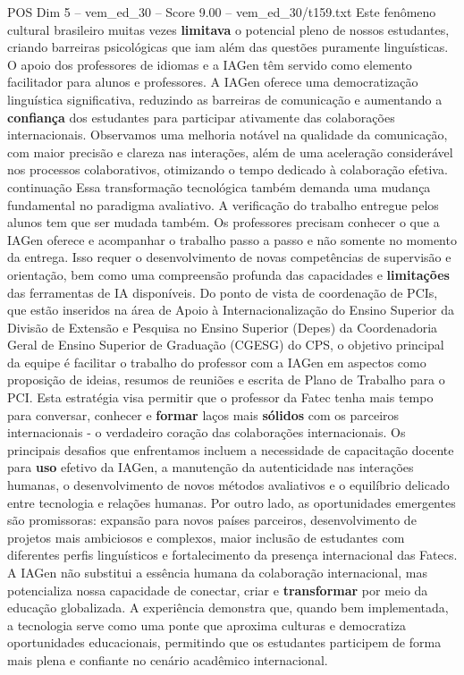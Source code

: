 \begin{textsample}{POS Dim 5 – vem\_ed\_30 – Score 9.00 – vem\_ed\_30/t159.txt}
Este fenômeno cultural brasileiro muitas vezes \textbf{limitava} o potencial pleno de nossos estudantes, criando barreiras psicológicas que iam além das questões puramente linguísticas.
O apoio dos professores de idiomas e a IAGen têm servido como elemento facilitador para alunos e professores.
A IAGen oferece uma democratização linguística significativa, reduzindo as barreiras de comunicação e aumentando a \textbf{confiança} dos estudantes para participar ativamente das colaborações internacionais.
Observamos uma melhoria notável na qualidade da comunicação, com maior precisão e clareza nas interações, além de uma aceleração considerável nos processos colaborativos, otimizando o tempo dedicado à colaboração efetiva. continuação Essa transformação tecnológica também demanda uma mudança fundamental no paradigma avaliativo.
A verificação do trabalho entregue pelos alunos tem que ser mudada também.
Os professores precisam conhecer o que a IAGen oferece e acompanhar o trabalho passo a passo e não somente no momento da entrega.
Isso requer o desenvolvimento de novas competências de supervisão e orientação, bem como uma compreensão profunda das capacidades e \textbf{limitações} das ferramentas de IA disponíveis.
Do ponto de vista de coordenação de PCIs, que estão inseridos na área de Apoio à Internacionalização do Ensino Superior da Divisão de Extensão e Pesquisa no Ensino Superior (Depes) da Coordenadoria Geral de Ensino Superior de Graduação (CGESG) do CPS, o objetivo principal da equipe é facilitar o trabalho do professor com a IAGen em aspectos como proposição de ideias, resumos de reuniões e escrita de Plano de Trabalho para o PCI.
Esta estratégia visa permitir que o professor da Fatec tenha mais tempo para conversar, conhecer e \textbf{formar} laços mais \textbf{sólidos} com os parceiros internacionais - o verdadeiro coração das colaborações internacionais.
Os principais desafios que enfrentamos incluem a necessidade de capacitação docente para \textbf{uso} efetivo da IAGen, a manutenção da autenticidade nas interações humanas, o desenvolvimento de novos métodos avaliativos e o equilíbrio delicado entre tecnologia e relações humanas.
Por outro lado, as oportunidades emergentes são promissoras: expansão para novos países parceiros, desenvolvimento de projetos mais ambiciosos e complexos, maior inclusão de estudantes com diferentes perfis linguísticos e fortalecimento da presença internacional das Fatecs.
A IAGen não substitui a essência humana da colaboração internacional, mas potencializa nossa capacidade de conectar, criar e \textbf{transformar} por meio da educação globalizada.
A experiência demonstra que, quando bem implementada, a tecnologia serve como uma ponte que aproxima culturas e democratiza oportunidades educacionais, permitindo que os estudantes participem de forma mais plena e confiante no cenário acadêmico internacional.

\end{textsample}
